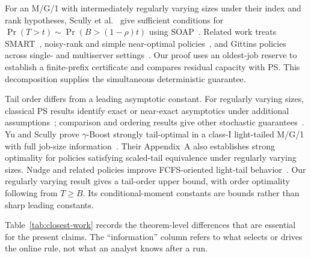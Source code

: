 For an M/G/1 with intermediately regularly varying sizes under their index and rank hypotheses, Scully et al.~\cite{scully2020characterizing} give sufficient conditions for $\Pr(T>t)\sim\Pr(B>(1-\rho)t)$ using SOAP~\cite{scully2018soap}. Related work treats SMART~\cite{nuyenssmart2008}, noisy-rank and simple near-optimal policies~\cite{scully2018bubbles,scully2020simple}, and Gittins policies across single- and multiserver settings~\cite{scully2020gittins,scully2021gittins,scullyvankreveld2024}. Our proof uses an oldest-job reserve to establish a finite-prefix certificate and compares residual capacity with PS. This decomposition supplies the simultaneous deterministic guarantee.

Tail order differs from a leading asymptotic constant. For regularly varying sizes, classical PS results identify exact or near-exact asymptotics under additional assumptions~\cite{zwartboxma2000,borst2006,guillemin2004}; comparison and ordering results give other stochastic guarantees~\cite{shanthikumar1987,boxmadenisov2011}. Yu and Scully prove $\gamma$-Boost strongly tail-optimal in a class-I light-tailed M/G/1 with full job-size information~\cite{yu2024}. Their Appendix~A also establishes strong optimality for policies satisfying scaled-tail equivalence under regularly varying sizes. Nudge and related policies improve FCFS-oriented light-tail behavior~\cite{grosof2021,vanhoudt2022,charlet2024}. Our regularly varying result gives a tail-order upper bound, with order optimality following from $T\geq B$. Its conditional-moment constants are bounds rather than sharp leading constants.

Table~\ref{tab:closest-work} records the theorem-level differences that are essential for the present claims. The ``information'' column refers to what selects or drives the online rule, not what an analyst knows after a run.

